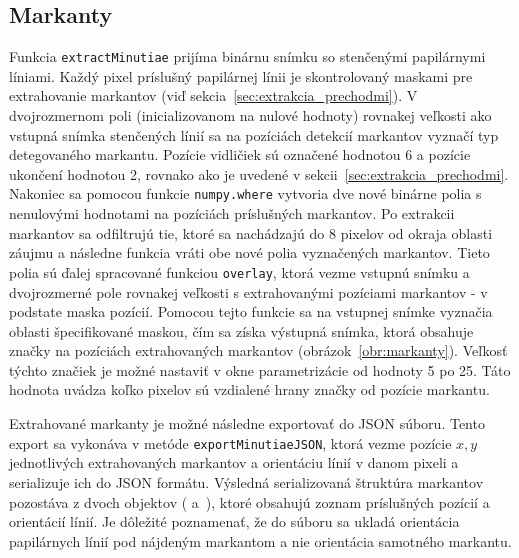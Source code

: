   \subsection{Markanty} \label{sec:markanty_algo}
  Funkcia \texttt{extractMinutiae} prijíma binárnu snímku so stenčenými papilárnymi líniami. Každý pixel príslušný papilárnej línii je skontrolovaný
  maskami pre extrahovanie markantov (viď sekcia~{\ref{sec:extrakcia_prechodmi}}). V dvojrozmernom poli (inicializovanom na nulové hodnoty) rovnakej veľkosti
  ako vstupná snímka stenčených línií sa na pozíciách detekcií markantov vyznačí typ detegovaného markantu. Pozície vidličiek sú označené hodnotou 6 a pozície
  ukončení hodnotou 2, rovnako ako je uvedené v sekcii~{\ref{sec:extrakcia_prechodmi}}. Nakoniec sa pomocou funkcie \texttt{numpy.where} vytvoria dve nové
  binárne polia s nenulovými hodnotami na pozíciách príslušných markantov. Po extrakcii markantov sa odfiltrujú tie, ktoré sa nachádzajú do 8 pixelov od okraja
  oblasti záujmu a následne funkcia vráti obe nové polia vyznačených markantov. Tieto polia sú ďalej
  spracované funkciou \texttt{overlay}, ktorá vezme vstupnú snímku a dvojrozmerné pole rovnakej veľkosti s extrahovanými pozíciami markantov -
  v podstate maska pozícií. Pomocou tejto funkcie sa na vstupnej snímke vyznačia oblasti špecifikované maskou, čím sa získa výstupná snímka, ktorá obsahuje
  značky na pozíciách extrahovaných markantov (obrázok~{\ref{obr:markanty}}). Veľkosť týchto značiek je možné nastaviť v okne parametrizácie od hodnoty
  5 po 25. Táto hodnota uvádza koľko pixelov sú vzdialené hrany značky od pozície markantu.

  Extrahované markanty je možné následne exportovať do JSON súboru. Tento export sa vykonáva v metóde \texttt{exportMinutiaeJSON}, ktorá vezme pozície
  $x, y$ jednotlivých extrahovaných markantov a orientáciu línií v danom pixeli a serializuje ich do JSON formátu. Výsledná serializovaná štruktúra markantov
  pozostáva z dvoch objektov ( a~{}), ktoré obsahujú zoznam príslušných pozícií a orientácií línií. Je dôležité poznamenať,
  že do súboru sa ukladá orientácia papilárnych línií pod nájdeným markantom a nie orientácia samotného markantu.


